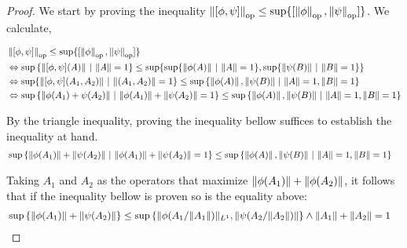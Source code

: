\documentclass[10pt,a4paper]{amsart}
\theoremstyle{definition}
\theoremstyle{definition}
\theoremstyle{definition}
\theoremstyle{definition}
\theoremstyle{definition}
\theoremstyle{definition}
\begin{document}
\begin{proof}

We start by proving the inequality $\left\lVert [\phi, \psi] \right\rVert_{\text{op}} \leq \sup \{[\left\lVert \phi \right\rVert_{\text{op}}, \left\lVert \psi \right\rVert_{\text{op}}]\}$. We calculate,

\begin{align*} 
  & \left\lVert [\phi, \psi] \right\rVert_{\text{op}} \leq \sup \{[\left\lVert \phi \right\rVert_{\text{op}}, \left\lVert \psi \right\rVert_{\text{op}}]\} \\
  &\Leftrightarrow \sup{\{ \left\lVert [\phi, \psi] (A) \right\rVert  \hspace{2pt} |  \hspace{2pt}  \left\lVert A \right\rVert = 1  \}}  
  \leq \sup \{ \sup\{ \left\lVert \phi (A) \right\rVert \hspace{2pt} |  \hspace{2pt}  \left\lVert A \right\rVert = 1 \}, \sup\{ \left\lVert \psi (B) \right\rVert \hspace{2pt} |  \hspace{2pt}  \left\lVert B \right\rVert = 1 \}\} \\
  &\Leftrightarrow  \text{sup}{\{ \left\lVert [\phi, \psi] (A_1, A_2) \right\rVert   \hspace{2pt} |  \hspace{2pt}  \left\lVert (A_1, A_2 ) \right\rVert = 1  \}}  
  \leq   \sup \left\{  \left\lVert \phi (A) \right\rVert ,   \left\lVert \psi (B) \right\rVert  \, \vert \,   \left\lVert A \right\rVert = 1, \left\lVert B \right\rVert = 1 \right\}  \\
  & \Leftrightarrow \sup \left\{  \left\lVert \phi (A_1) + \psi (A_2) \right\rVert  \, \vert \, \left\lVert \phi(A_1) \right\rVert + \left\lVert \psi(A_2) \right\rVert= 1 \right\}  
  \leq \sup \left\{  \left\lVert \phi (A) \right\rVert,   \left\lVert \psi (B) \right\rVert  \, \vert \,   \left\lVert A \right\rVert = 1, \left\lVert B \right\rVert = 1 \right\}  \\
\end{align*}

By the triangle inequality, proving the inequality bellow suffices to establish the inequality at hand.
\begin{align*}
  &\sup \left\{  \left\lVert \phi (A_1) \right\rVert +   \left\lVert \psi (A_2) \right\rVert  \, \vert \, \left\lVert \phi(A_1) \right\rVert + \left\lVert \psi(A_2) \right\rVert= 1 \right\}  
  \leq \sup \left\{  \left\lVert \phi (A) \right\rVert,   \left\lVert \psi (B) \right\rVert  \, \vert \,   \left\lVert A \right\rVert = 1, \left\lVert B \right\rVert = 1 \right\} 
\end{align*}


Taking $A_1$ and $A_2$ as the operators that maximize $\left\lVert \phi (A_1) \right\rVert + \left\lVert \phi (A_2) \right\rVert$, it follows that if the inequality bellow is proven so is the equality above:
\begin{align*}
  & \sup \left\{  \left\lVert \phi (A_1) \right\rVert +   \left\lVert \psi (A_2) \right\rVert  \right\}  
  \leq  \sup \left\{  \left\lVert \phi (A_{1} / \lVert A_{1} \rVert ) \rVert_{L^1},   \lVert \psi (A_{2} / \lVert A_{2} \rVert )  \right\rVert  \right\}  
  \wedge  \lVert A_{1} \rVert+ \lVert A_{2} \rVert=1 
\end{align*}



\end{proof}
\end{document}
